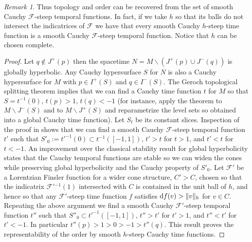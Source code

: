 \documentclass[a4paper]{jpconf}
\theoremstyle{definition}
\theoremstyle{remark}
\newtheorem{remark}[theorem]{Remark}
\newcommand{\dd}{{\rm d}}
\begin{document}
\begin{remark} \label{mja}
Thus topology and order can be recovered from the set of smooth  Cauchy $\mathscr{F}$-steep temporal  functions. In fact, if we take $h$ so that its balls do not intersect the indicatrices of $\mathscr{F}$ we have that every smooth Cauchy $h$-steep time  function is a smooth  Cauchy $\mathscr{F}$-steep temporal  function. Notice that $h$ can be chosen complete.
\end{remark}

\begin{proof}
Let $q\notin J^+(p)$ then the spacetime  $N=M\backslash (J^+(p)\cup J^{-}(q))$ is globally hyperbolic. Any Cauchy hypersurface $S$ for $N$ is also  a Cauchy hypersurface for $M$ with $p\in I^+(S)$ and $q\in I^{-}(S)$.
The Geroch topological splitting theorem \cite{hawking73} implies that we can find a Cauchy time function $t$ for $M$ so that $S=t^{-1}(0)$, $t(p)>1$, $t(q)<-1$ (for instance, apply the theorem to $M\backslash J^{-}(S)$ and to $M\backslash J^{+}(S)$  and reparametrize the level sets so obtained into a global Cauchy time function). Let $S_t$ be its constant slices. Inspection of the proof in \cite{minguzzi16a} shows that we can find a smooth Cauchy $\mathscr{F}$-steep temporal function  $t'$ such that  $S'_0:=t'^{-1}(0)\subset t^{-1}([-1,1])$, $t'>t$ for $t>1$, and $t'<t$ for $t<-1$.
An improvement \cite[Th.\ 47]{minguzzi17} over the classical stability result for global hyperbolicity \cite{minguzzi11e,fathi12,samann16,minguzzi17} states that the Cauchy temporal functions are stable so
we can widen the cones while preserving global hyperbolicity and the Cauchy property of $S'_0$. Let $\mathscr{F}'$ be a Lorentzian Finsler function for a wider cone structure, $C'>C$,  chosen so that the indicatrix $\mathscr{F}'{}^{-1}(1)$ intersected with $C$ is contained in the unit ball of $h$, and hence so that any $\mathscr{F}'$-steep
time function $f$ satisfies $\dd f(v)> \Vert v \Vert_h $ for $v\in C$. Repeating the  above argument we find a smooth Cauchy $\mathscr{F}'$-steep temporal function  $t''$ such that  $S''_0\subset {t'}^{-1}([-1,1])$, $t''>t'$ for $t'>1$, and $t''<t'$ for $t'<-1$.  In particular $t''(p)>1>0>-1>t''(q)$. This result proves the representability of the order by smooth $h$-steep Cauchy time functions.




\end{proof}
\end{document}
